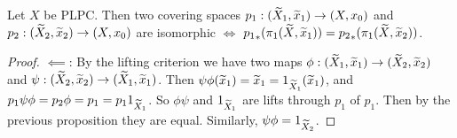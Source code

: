 \begin{prop}
	Let $X$ be PLPC.
	Then two covering spaces $p_1: (\widetilde X_1,\widetilde x_1) \to (X,x_0)$ and $p_2: (\widetilde X_2,\widetilde x_2) \to (X,x_0)$ are isomorphic $\iff$ ${p_1}_*(\pi_1(\widetilde X,\widetilde x_1)) = {p_2}_*(\pi_1(\widetilde X,\widetilde x_2))$.
\end{prop}

\begin{proof}
	$\impliedby$:
	By the lifting criterion we have two maps $\phi: (\widetilde X_1,\widetilde x_1) \to (\widetilde X_2,\widetilde x_2)$ and $\psi: (\widetilde X_2,\widetilde x_2) \to (\widetilde X_1,\widetilde x_1)$.
	Then $\psi\phi(\widetilde x_1) = \widetilde x_1 = 1_{\widetilde X_1}(\widetilde x_1)$, and $p_1\psi\phi = p_2\phi = p_1 = p_11_{\widetilde X_1}$.
So $\phi\psi$ and $1_{\widetilde X_1}$ are lifts through $p_1$ of $p_1$.
	Then by the previous proposition they are equal.
	Similarly, $\psi\phi=1_{\widetilde X_2}$.
\end{proof}
